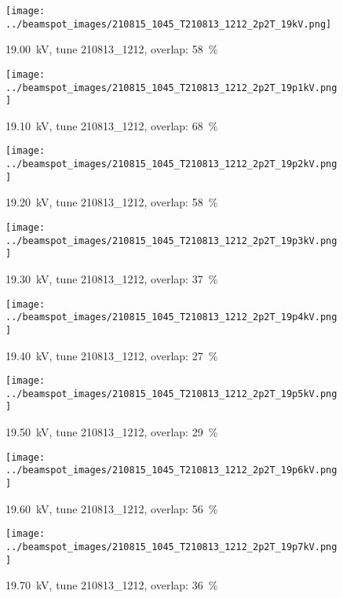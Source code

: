 \begin{figure}[ht]
\centering
\texttt{[image: ../beamspot\_images/210815\_1045\_T210813\_1212\_2p2T\_19kV.png]}
\caption[19.00 kV]{\SI{19.00}{\kV}, tune 210813\_1212, overlap: \SI{58}{\%}}
\label{19.00_kV}
\end{figure}

\begin{figure}[ht]
\centering
\texttt{[image: ../beamspot\_images/210815\_1045\_T210813\_1212\_2p2T\_19p1kV.png]}
\caption[19.10 kV]{\SI{19.10}{\kV}, tune 210813\_1212, overlap: \SI{68}{\%}}
\label{19.10_kV}
\end{figure}

\begin{figure}[ht]
\centering
\texttt{[image: ../beamspot\_images/210815\_1045\_T210813\_1212\_2p2T\_19p2kV.png]}
\caption[19.20 kV]{\SI{19.20}{\kV}, tune 210813\_1212, overlap: \SI{58}{\%}}
\label{19.20_kV}
\end{figure}

\begin{figure}[ht]
\centering
\texttt{[image: ../beamspot\_images/210815\_1045\_T210813\_1212\_2p2T\_19p3kV.png]}
\caption[19.30 kV]{\SI{19.30}{\kV}, tune 210813\_1212, overlap: \SI{37}{\%}}
\label{19.30_kV}
\end{figure}

\begin{figure}[ht]
\centering
\texttt{[image: ../beamspot\_images/210815\_1045\_T210813\_1212\_2p2T\_19p4kV.png]}
\caption[19.40 kV]{\SI{19.40}{\kV}, tune 210813\_1212, overlap: \SI{27}{\%}}
\label{19.40_kV}
\end{figure}

\begin{figure}[ht]
\centering
\texttt{[image: ../beamspot\_images/210815\_1045\_T210813\_1212\_2p2T\_19p5kV.png]}
\caption[19.50 kV]{\SI{19.50}{\kV}, tune 210813\_1212, overlap: \SI{29}{\%}}
\label{19.50_kV}
\end{figure}

\begin{figure}[ht]
\centering
\texttt{[image: ../beamspot\_images/210815\_1045\_T210813\_1212\_2p2T\_19p6kV.png]}
\caption[19.60 kV]{\SI{19.60}{\kV}, tune 210813\_1212, overlap: \SI{56}{\%}}
\label{19.60_kV}
\end{figure}

\begin{figure}[ht]
\centering
\texttt{[image: ../beamspot\_images/210815\_1045\_T210813\_1212\_2p2T\_19p7kV.png]}
\caption[19.70 kV]{\SI{19.70}{\kV}, tune 210813\_1212, overlap: \SI{36}{\%}}
\label{19.70_kV}
\end{figure}
